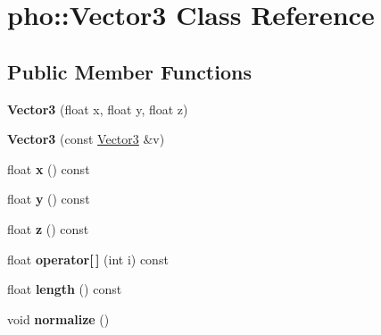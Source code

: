 \hypertarget{classpho_1_1Vector3}{\section{pho\-:\-:Vector3 Class Reference}
\label{classpho_1_1Vector3}
}
\subsection*{Public Member Functions}
\begin{DoxyCompactItemize}
\item 
\hypertarget{classpho_1_1Vector3_ac454d0cf76326e6e16a52ac46a62ee8f}{{\bfseries Vector3} (float x, float y, float z)}\label{classpho_1_1Vector3_ac454d0cf76326e6e16a52ac46a62ee8f}

\item 
\hypertarget{classpho_1_1Vector3_a2126f49b2dd9d4d1dc6ec305b12bad04}{{\bfseries Vector3} (const \hyperlink{classpho_1_1Vector3}{Vector3} \&v)}\label{classpho_1_1Vector3_a2126f49b2dd9d4d1dc6ec305b12bad04}

\item 
\hypertarget{classpho_1_1Vector3_a524e426fc1c01190618640d45f8bc730}{float {\bfseries x} () const }\label{classpho_1_1Vector3_a524e426fc1c01190618640d45f8bc730}

\item 
\hypertarget{classpho_1_1Vector3_aaf967c14c11eb003aca9ec9f3de29bd0}{float {\bfseries y} () const }\label{classpho_1_1Vector3_aaf967c14c11eb003aca9ec9f3de29bd0}

\item 
\hypertarget{classpho_1_1Vector3_a9abf1bfb23662e46a953fee3d53474e6}{float {\bfseries z} () const }\label{classpho_1_1Vector3_a9abf1bfb23662e46a953fee3d53474e6}

\item 
\hypertarget{classpho_1_1Vector3_abcd804a1124a748d3b9ab1c5e8c93d40}{float {\bfseries operator\mbox{[}$\,$\mbox{]}} (int i) const }\label{classpho_1_1Vector3_abcd804a1124a748d3b9ab1c5e8c93d40}

\item 
\hypertarget{classpho_1_1Vector3_a297bd1c6a3690cbb62d6351c1d231a23}{float {\bfseries length} () const }\label{classpho_1_1Vector3_a297bd1c6a3690cbb62d6351c1d231a23}

\item 
\hypertarget{classpho_1_1Vector3_a1495858c806e08eef5a82fce916e7da4}{void {\bfseries normalize} ()}\label{classpho_1_1Vector3_a1495858c806e08eef5a82fce916e7da4}


\end{DoxyCompactItemize}
